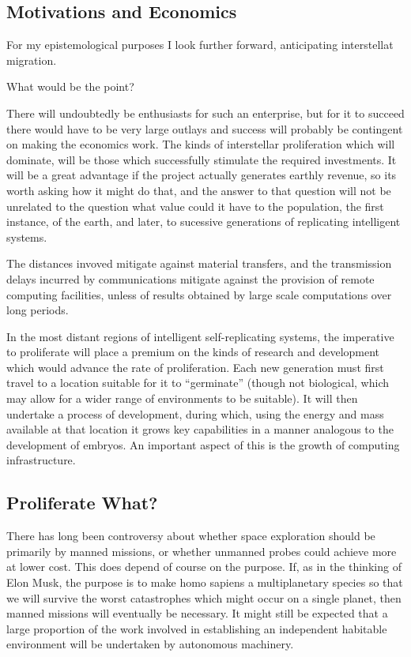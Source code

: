 \documentclass[10pt,titlepage]{article}
\begin{document}
\subsection{Motivations and Economics}

For my epistemological purposes I look further forward, anticipating interstellat migration.

What would be the point?

There will undoubtedly be enthusiasts for such an enterprise, but for it to succeed there would have to be very large outlays and success will probably be contingent on making the economics work.
The kinds of interstellar proliferation which will dominate, will be those which successfully stimulate the required investments.
It will be a great advantage if the project actually generates earthly revenue, so its worth asking how it might do that, and the answer to that question will not be unrelated to the question what value could it have to the population, the first instance, of the earth, and later, to sucessive generations of replicating intelligent systems.

The distances invoved mitigate against material transfers, and the transmission delays incurred by communications mitigate against the provision of remote computing facilities, unless of results obtained by large scale computations over long periods.

In the most distant regions of intelligent self-replicating systems, the imperative to proliferate will place a premium on the kinds of research and development which would advance the rate of proliferation.
Each new generation must first travel to a location suitable for it to ``germinate'' (though not biological, which may allow for a wider range of environments to be suitable).
It will then undertake a process of development, during which, using the energy and mass available at that location it grows key capabilities in a manner analogous to the development of embryos.
An important aspect of this is the growth of computing infrastructure.

\subsection{Proliferate What?}

There has long been controversy about whether space exploration should be primarily by manned missions, or whether unmanned probes could achieve more at lower cost.
This does depend of course on the purpose.
If, as in the thinking of Elon Musk, the purpose is to make homo sapiens a multiplanetary species so that we will survive the worst catastrophes which might occur on a single planet, then manned missions will eventually be necessary.
It might still be expected that a large proportion of the work involved in establishing an independent habitable environment will be undertaken by autonomous machinery.
\end{document}
